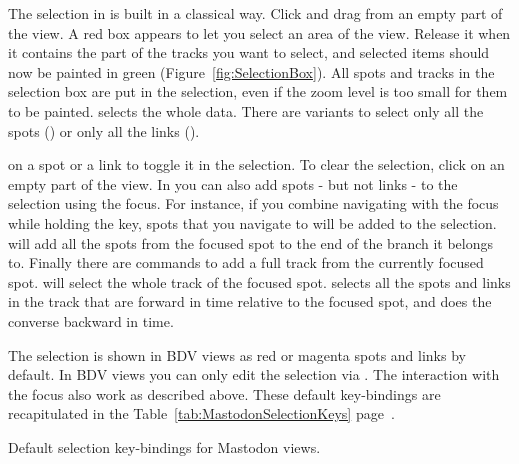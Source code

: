 The selection in \TrackScheme is built in a classical way. 
Click and drag from an empty part of the view.
A red box appears to let you select an area of the view.
Release it when it contains the part of the tracks you want to select, and selected items should now be painted in green (Figure~\ref{fig:SelectionBox}).
All spots and tracks in the selection box are put in the selection, even if the zoom level is too small for them to be painted.
 selects the whole data. 
There are variants to select only all the spots () or only all the links ().

 on a spot or a link to toggle it in the selection.
To clear the selection, click on an empty part of the \TrackScheme view.
In \TrackScheme you can also add spots - but not links - to the selection using the focus.
For instance, if you combine navigating with the focus while holding the \keys{\shift} key, spots that you navigate to will be added to the selection. 
\keys{\shift+\Alt+\arrowkeydown} will add all the spots from the focused spot to the end of the branch it belongs to.
Finally there are commands to add a full track from the currently focused spot. 
 will select the whole track of the focused spot.
 selects all the spots and links in the track that are forward in time relative to the focused spot, and  does the converse backward in time.

The selection is shown in BDV views as red or magenta spots and links by default.
In BDV views you can only edit the selection via .
The interaction with the focus also work as described above.
These default key-bindings are recapitulated in the Table~\ref{tab:MastodonSelectionKeys} page~\pageref{tab:MastodonSelectionKeys}.

\begin{table}[!htbp]
    \centering
    \caption{Default selection key-bindings for Mastodon views.}
    
    \label{tab:MastodonSelectionKeys}
\end{table}


